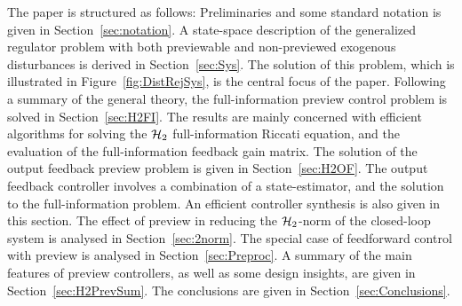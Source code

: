 The paper is structured as follows: Preliminaries and some standard notation is given in Section~\ref{sec:notation}. A state-space description of the generalized regulator problem with both previewable and non-previewed exogenous disturbances is derived in Section~\ref{sec:Sys}. The solution of this problem, which is illustrated in Figure~\ref{fig:DistRejSys}, is the central focus of the paper. Following a summary of the general theory, the full-information preview control problem is solved in Section~\ref{sec:H2FI}. The results are mainly concerned with efficient algorithms for solving the $\mathcal H_2$ full-information Riccati equation, and the evaluation of the full-information feedback gain matrix. The solution of the output feedback preview problem is given in Section~\ref{sec:H2OF}. The output feedback controller involves a combination of a state-estimator, and the solution to the full-information problem. An efficient controller synthesis is also given in this section. The effect of preview in reducing the $\mathcal H_2$-norm of the closed-loop system is analysed in Section~\ref{sec:2norm}. The special case of feedforward control with preview is analysed in Section~\ref{sec:Preproc}. A summary of the main features of preview controllers, as well as some design insights, are given in Section~\ref{sec:H2PrevSum}. The conclusions are given in Section~\ref{sec:Conclusions}.